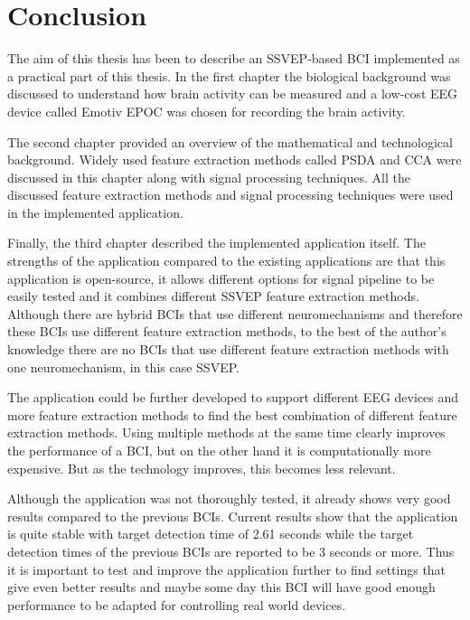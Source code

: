 
\chapter*{Conclusion}

The aim of this thesis has been to describe an \gls{SSVEP}-based \gls{BCI} implemented as a practical part of this thesis. In the first chapter the biological background was discussed to understand how brain activity can be measured and a low-cost \gls{EEG} device called Emotiv EPOC was chosen for recording the brain activity.

The second chapter provided an overview of the mathematical and technological background. Widely used \gls{feature extraction} methods called \gls{PSDA} and \gls{CCA} were discussed in this chapter along with signal processing techniques. All the discussed \gls{feature extraction} methods and signal processing techniques were used in the implemented application.

Finally, the third chapter described the implemented application itself. The strengths of the application compared to the existing applications are that this application is open-source, it allows different options for signal pipeline to be easily tested and it combines different \gls{SSVEP} \gls{feature extraction} methods. Although there are hybrid \glspl{BCI} that use different neuromechanisms and therefore these \glspl{BCI} use different \gls{feature extraction} methods, to the best of the author's knowledge there are no \glspl{BCI} that use different \gls{feature extraction} methods with one neuromechanism, in this case \gls{SSVEP}.

The application could be further developed to support different \gls{EEG} devices and more \gls{feature extraction} methods to find the best combination of different \gls{feature extraction} methods. Using multiple methods at the same time clearly improves the performance of a \gls{BCI}, but on the other hand it is computationally more expensive. But as the technology improves, this becomes less relevant.

Although the application was not thoroughly tested, it already shows very good results compared to the previous \glspl{BCI}. Current results show that the application is quite stable with \gls{target} detection time of 2.61 seconds while the \gls{target} detection times of the previous \glspl{BCI} are reported to be 3 seconds or more. Thus it is important to test and improve the application further to find settings that give even better results and maybe some day this \gls{BCI} will have good enough performance to be adapted for controlling real world devices.
